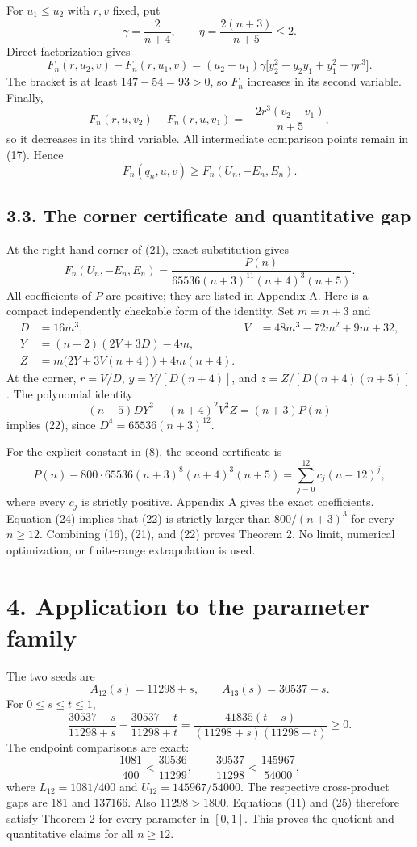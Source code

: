 \documentclass[
  11pt,
  a4paper,
]{article}
\begin{document}
For \(u_1\le u_2\) with \(r,v\) fixed, put \[
\gamma=\frac2{n+4},\qquad \eta=\frac{2(n+3)}{n+5}\le2.
\] Direct factorization gives \[
F_n(r,u_2,v)-F_n(r,u_1,v)
=(u_2-u_1)\gamma\bigl[y_2^2+y_2y_1+y_1^2-\eta r^3\bigr].
\tag{19}
\] The bracket is at least \(147-54=93>0\), so \(F_n\) increases in its
second variable. Finally, \[
F_n(r,u,v_2)-F_n(r,u,v_1)=-\frac{2r^3(v_2-v_1)}{n+5},
\tag{20}
\] so it decreases in its third variable. All intermediate comparison
points remain in (17). Hence \[
F_n(q_n,u,v)\ge F_n(U_n,-E_n,E_n).
\tag{21}
\]

\subsection{3.3. The corner certificate and quantitative
gap}\label{the-corner-certificate-and-quantitative-gap}

At the right-hand corner of (21), exact substitution gives \[
F_n(U_n,-E_n,E_n)
=\frac{P(n)}{65536(n+3)^{11}(n+4)^3(n+5)}.
\tag{22}
\] All coefficients of \(P\) are positive; they are listed in Appendix
A. Here is a compact independently checkable form of the identity. Set
\(m=n+3\) and \[
\begin{aligned}
D&=16m^3,& V&=48m^3-72m^2+9m+32,\\
Y&=(n+2)(2V+3D)-4m,\\
Z&=m\bigl(2Y+3V(n+4)\bigr)+4m(n+4).
\end{aligned}
\] At the corner, \(r=V/D\), \(y=Y/[D(n+4)]\), and
\(z=Z/[D(n+4)(n+5)]\). The polynomial identity \[
(n+5)DY^3-(n+4)^2V^3Z=(n+3)P(n)
\tag{23}
\] implies (22), since \(D^4=65536(n+3)^{12}\).

For the explicit constant in (8), the second certificate is \[
P(n)-800\cdot65536(n+3)^8(n+4)^3(n+5)
=\sum_{j=0}^{12}c_j(n-12)^j,
\tag{24}
\] where every \(c_j\) is strictly positive. Appendix A gives the exact
coefficients. Equation (24) implies that (22) is strictly larger than
\(800/(n+3)^3\) for every \(n\ge12\). Combining (16), (21), and (22)
proves Theorem 2. No limit, numerical optimization, or finite-range
extrapolation is used.

\section{4. Application to the parameter
family}\label{application-to-the-parameter-family}

The two seeds are \[
A_{12}(s)=11298+s,\qquad A_{13}(s)=30537-s.
\] For \(0\le s\le t\le1\), \[
\frac{30537-s}{11298+s}-\frac{30537-t}{11298+t}
=\frac{41835(t-s)}{(11298+s)(11298+t)}\ge0.
\] The endpoint comparisons are exact: \[
\frac{1081}{400}<\frac{30536}{11299},\qquad
\frac{30537}{11298}<\frac{145967}{54000},
\tag{25}
\] where \(L_{12}=1081/400\) and \(U_{12}=145967/54000\). The respective
cross-product gaps are 181 and 137166. Also \(11298>1800\). Equations
(11) and (25) therefore satisfy Theorem 2 for every parameter in
\([0,1]\). This proves the quotient and quantitative claims for all
\(n\ge12\).
\end{document}
